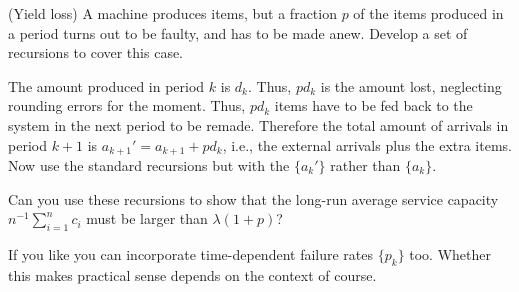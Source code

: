 \begin{exercise}
  (Yield loss) A machine produces items, but a fraction $p$ of the
  items produced in a period turns out to be faulty, and has to be
  made anew. Develop a set of recursions to cover this case.
  \begin{solution}
    The amount produced in period $k$ is $d_k$. Thus, $p d_k$ is the
    amount lost, neglecting rounding errors for the moment. Thus,
    $p d_k$ items have to be fed back to the system in the next period
    to be remade. Therefore the total amount of arrivals in period
    $k+1$ is $a_{k+1}'=a_{k+1}+pd_k$, i.e., the external arrivals plus
    the extra items. Now use the standard recursions but with the
    $\{a_{k}'\}$ rather than $\{a_k\}$.

    Can you use these recursions to show that the long-run average
    service capacity $n^{-1}\sum_{i=1}^n c_i$ must be larger than
    $\lambda(1+p)$?

    If you like you can incorporate time-dependent failure rates
    $\{p_k\}$ too. Whether this makes practical sense depends on the
    context of course.
      \end{solution}
\end{exercise}


